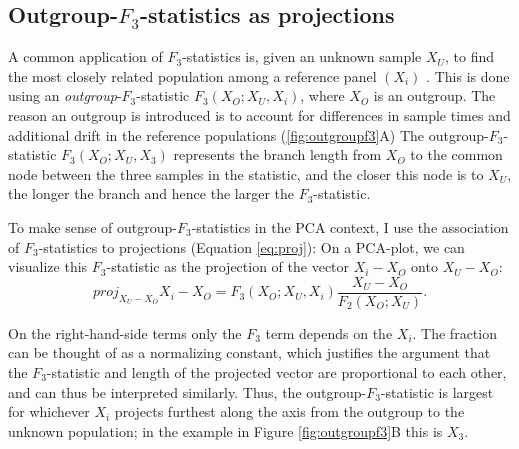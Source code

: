 \documentclass[12pt,fullpage, a4paper]{article}
\newcommand{\vectorproj}[2][]{\textit{proj}_{#1}#2}
\begin{document}
\subsection{Outgroup-$F_3$-statistics as projections}
A common application of $F_3$-statistics is, given an unknown sample $X_U$, to find the most closely related population among a reference panel $(X_i)$ \citep{raghavan2014}. This is done  using an \emph{outgroup}-$F_3$-statistic $F_3(X_O; X_U, X_i)$, where $X_O$ is an outgroup. The reason an outgroup is introduced is to account for differences in sample times and additional drift in the reference populations (\ref{fig:outgroupf3}A) The outgroup-$F_3$-statistic $F_3(X_O; X_U, X_3)$ represents the branch length from $X_O$ to the common node between the three samples in the statistic, and the closer this node is to $X_U$, the longer the branch and hence the larger the $F_3$-statistic. 

To make sense of outgroup-$F_3$-statistics in the PCA context, I use the association of $F_3$-statistics to projections (Equation \ref{eq:proj}):
On a PCA-plot, we can visualize this $F_3$-statistic as the projection of the vector $X_i - X_O$ onto $X_U - X_O$: 
$$\vectorproj[X_U - X_O]{X_i - X_O} =F_3(X_O; X_U, X_i) \frac{X_U - X_O}{F_2(X_O; X_U)}.$$

On the right-hand-side terms only the $F_3$ term depends on the $X_i$. The fraction can be thought of as a normalizing constant,  which justifies the argument that the $F_3$-statistic and length of the projected vector are proportional to each other, and can thus be interpreted similarly. Thus, the outgroup-$F_3$-statistic is largest for whichever $X_i$ projects furthest along the axis from the outgroup to the unknown population; in the example in Figure \ref{fig:outgroupf3}B this is $X_3$.
\end{document}
